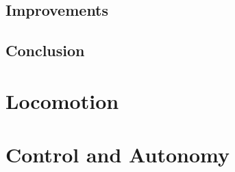 \subsection{Improvements}

\subsection{Conclusion}

\clearpage

\section{Locomotion}
\label{sec:locomotion}



\section{Control and Autonomy}
\label{sec:ControlandAutonomy}

\cleardoublepage